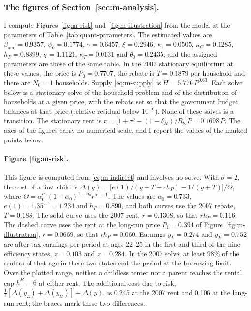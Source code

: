 \subsubsection*{The figures of Section~\ref{sec:m-analysis}.}
\label{app:model-figures}
I compute Figures~\ref{fig:m-risk} and~\ref{fig:m-illustration} from the model at the parameters of
Table~\ref{tab:quant-parameters}. The estimated values are
$\beta_{\text{ann}}=0.9357$, $\psi_0=0.1774$, $\gamma=0.6457$, $\xi=0.2946$,
$\kappa_1=0.0505$, $\kappa_C=0.1285$, $h_P=0.8899$, $\chi=1.1121$,
$\kappa_T=0.0131$ and $\theta_0=0.2435$, and the assigned parameters are those
of the same table. In the 2007 stationary equilibrium at these values, the
price is $P_0=0.7707$, the rebate is $T=0.1879$ per household and there are
$N_0=1$ households. Supply \eqref{eq:m-supply} is $H=6.776\,P^{0.63}$. Each
solve below is a stationary solve of the household problem and of the
distribution of households at a given price, with the rebate set so that the
government budget balances at that price (relative residual below
$10^{-6}$). None of these solves is a transition. The stationary rent is
$r=\bigl[1+\tau^p-(1-\delta_H)/R_b\bigr]P=0.1698\,P$. The axes of the figures
carry no numerical scale, and I report the values of the marked points
below.

\paragraph{Figure~\ref{fig:m-risk}.} This figure is computed from
\eqref{eq:m-indirect} and involves no solve. With $\sigma=2$, the cost of a
first child is
$\Delta(y)=\bigl[e(1)/(y+T-rh_P)-1/(y+T)\bigr]/\Theta$, where
$\Theta=\alpha_0^{\alpha_0}(1-\alpha_0)^{1-\alpha_0}r^{\alpha_0-1}$. The
values are $\alpha_0=0.733$, $e(1)=1.35^{0.7}=1.234$ and $h_P=0.890$, and
both curves use the 2007 rebate, $T=0.188$. The solid curve uses the 2007
rent, $r=0.1308$, so that $rh_P=0.116$. The dashed curve uses the rent at
the long-run price $P_1=0.394$ of Figure~\ref{fig:m-illustration},
$r=0.0669$, so that $rh_P=0.060$. Earnings $y_L=0.274$ and $y_H=0.752$ are
after-tax earnings per period at ages 22--25 in the first and third of the
nine efficiency states, $z=0.103$ and $z=0.284$. In the 2007 solve, at least
98\% of the renters of that age in these two states end the period at the
borrowing limit. Over the plotted range, neither a childless renter nor a
parent reaches the rental cap $\bar h^R=6$ at either rent. The additional
cost due to risk, $\tfrac12[\Delta(y_L)+\Delta(y_H)]-\Delta(\bar y)$, is 0.245
at the 2007 rent and 0.106 at the long-run rent; the braces mark these two
differences.

